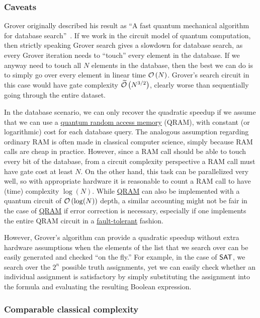 \begin{refsection}
	\subsubsection*{Caveats}
	Grover originally described his result as ``A fast quantum mechanical algorithm for database search''~\cite{grover1996QSearch}. If we work in the circuit model of quantum computation, then strictly speaking Grover search gives a slowdown for database search, as  every Grover iteration  needs to ``touch'' every element in the database. If we anyway need to touch all $N$ elements in the database, then the best we can do is to simply go over every element in linear time $\mathcal{O}\left( N \right)$. Grover's search circuit in this case would have gate complexity $\widetilde{\mathcal{O}}\left( N^{3/2} \right)$, clearly worse than sequentially going through the entire dataset.
	
	In the database scenario, we can only recover the quadratic speedup if we assume that we can use a \hyperref[prim:QRAM]{quantum random access memory}  (QRAM), with constant (or logarithmic) cost for each database query. The analogous assumption regarding ordinary RAM is often made in classical computer science, simply because RAM calls are cheap in practice. However, since a RAM call should be able to touch every bit of the database, from a circuit complexity perspective a RAM call must have gate cost at least $N$. On the other hand, this task can be parallelized very well, so with appropriate hardware it is reasonable to count a RAM call to have (time) complexity $\log(N)$. While \hyperref[prim:QRAM]{QRAM} can also be implemented with a quantum circuit of $\mathcal{O}\left( \log(N) \right)$ depth, a similar  accounting might not be fair in the case of \hyperref[prim:QRAM]{QRAM} if error correction is necessary, especially if one implements the entire QRAM circuit in a \hyperref[prim:FTQC]{fault-tolerant} fashion.
	
	
	However, Grover's algorithm can provide a quadratic speedup without extra hardware assumptions when the elements of the list that we search over can be easily generated and checked ``on the fly.'' For example, in the case of $\mathsf{SAT}$, we search over the $2^n$ possible truth assignments, yet we can easily check whether an individual assignment is satisfactory by simply substituting the assignment into the formula and evaluating the resulting Boolean expression. 
	
	
	
	\subsubsection*{Comparable classical complexity}
	

\end{refsection}
